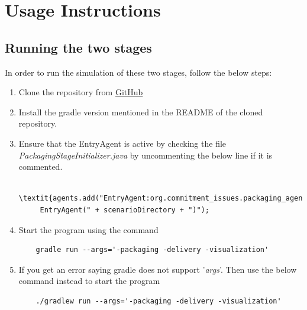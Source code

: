 \documentclass[11pt, a4paper]{article}
\begin{document}
\section{Usage Instructions}

\subsection{Running the two stages}
In order to run the simulation of these two stages, follow the below steps:
\begin{enumerate}
	\item Clone the repository from \href{https://github.com/HBRS-MAAS/ws18-project-commitment_issues}{GitHub}
	\item Install the gradle version mentioned in the README of the cloned repository.
	\item Ensure that the EntryAgent is active by checking the file \textit{PackagingStageInitializer.java} by uncommenting the below line if it is commented.
	\begin{verbatim}	 \textit{agents.add("EntryAgent:org.commitment_issues.packaging_agents.
	 EntryAgent(" + scenarioDirectory + ")"); \end{verbatim} 
	\item Start the program using the command
	\begin{verbatim}
	gradle run --args='-packaging -delivery -visualization'
	\end{verbatim}
	\item If you get an error saying gradle does not support '\textit{args}'. Then use the below command instead to start the program
	\begin{verbatim}
	./gradlew run --args='-packaging -delivery -visualization'
	\end{verbatim}
\end{enumerate}
\end{document}
